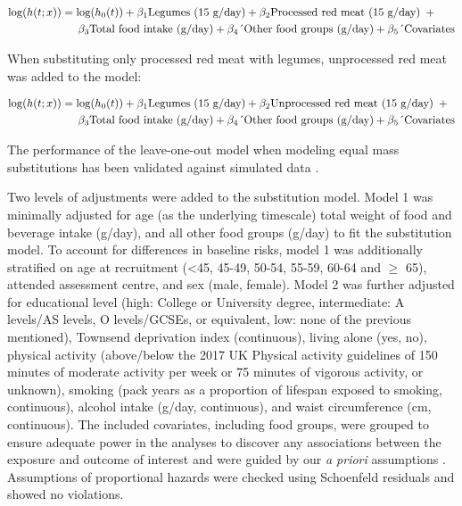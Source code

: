 \documentclass[nutrients,article,submit,moreauthors,pdftex]{Definitions/mdpi}
\begin{document}
{\small
\begin{align}
\log(h(t;x)) &= \log(h_0(t)) + \beta_1 \text{Legumes (15 g/day)} + \beta_2 \text{Processed red meat (15 g/day)} \hspace{0.5em} + \nonumber \\
&\quad \hspace{0.5em} \beta_3 \text{Total food intake (g/day)} + \beta_4 \text{´Other food groups (g/day)} + \beta_5 \text{´Covariates}
\end{align}
}

\noindent When substituting only processed red meat with legumes,
unprocessed red meat was added to the model:

{\small
\begin{align}
\log(h(t;x)) &= \log(h_0(t)) + \beta_1 \text{Legumes (15 g/day)} + \beta_2 \text{Unprocessed red meat (15 g/day)} \hspace{0.5em} + \nonumber \\
&\quad \hspace{0.5em} \beta_3 \text{Total food intake (g/day)}  + \beta_4 \text{´Other food groups (g/day)} + \beta_5 \text{´Covariates}
\end{align}
}

\noindent The performance of the leave-one-out model when modeling equal
mass substitutions has been validated against simulated data
\citep{Tomova2022}.

Two levels of adjustments were added to the substitution model. Model 1
was minimally adjusted for age (as the underlying timescale) total
weight of food and beverage intake (g/day), and all other food groups
(g/day) to fit the substitution model. To account for differences in
baseline risks, model 1 was additionally stratified on age at
recruitment (\textless45, 45-49, 50-54, 55-59, 60-64 and \(\geq\) 65), attended
assessment centre, and sex (male, female). Model 2 was further adjusted
for educational level (high: College or University degree, intermediate:
A levels/AS levels, O levels/GCSEs, or equivalent, low: none of the
previous mentioned), Townsend deprivation index (continuous), living
alone (yes, no), physical activity (above/below the 2017 UK Physical
activity guidelines of 150 minutes of moderate activity per week or 75
minutes of vigorous activity, or unknown), smoking (pack years as a
proportion of lifespan exposed to smoking, continuous), alcohol intake
(g/day, continuous), and waist circumference (cm, continuous). The
included covariates, including food groups, were grouped to ensure
adequate power in the analyses to discover any associations between the
exposure and outcome of interest and were guided by our \emph{a priori}
assumptions \citep{protocol}. Assumptions of proportional hazards were
checked using Schoenfeld residuals and showed no violations.
\end{document}
